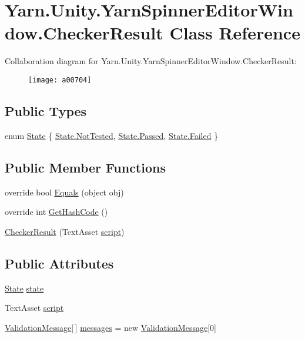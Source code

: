 \hypertarget{a00049}{\section{Yarn.\-Unity.\-Yarn\-Spinner\-Editor\-Window.\-Checker\-Result Class Reference}
\label{a00049}
}


Collaboration diagram for Yarn.\-Unity.\-Yarn\-Spinner\-Editor\-Window.\-Checker\-Result\-:
\nopagebreak
\begin{figure}[H]
\begin{center}
\leavevmode
\texttt{[image: a00704]}
\end{center}
\end{figure}
\subsection*{Public Types}
\begin{DoxyCompactItemize}
\item 
enum \hyperlink{a00049_ab24848d7951ce44eb3c7768c6ee10385}{State} \{ \hyperlink{a00049_ab24848d7951ce44eb3c7768c6ee10385a0197c47523ba5a2bdfef705786687de5}{State.\-Not\-Tested}, 
\hyperlink{a00049_ab24848d7951ce44eb3c7768c6ee10385aa0d0628f6b4e4d78d2ffef4d4d1c4b15}{State.\-Passed}, 
\hyperlink{a00049_ab24848d7951ce44eb3c7768c6ee10385ad7c8c85bf79bbe1b7188497c32c3b0ca}{State.\-Failed}
 \}
\end{DoxyCompactItemize}
\subsection*{Public Member Functions}
\begin{DoxyCompactItemize}
\item 
override bool \hyperlink{a00049_a1e653caad5ab99847c26ff8f67da8f45}{Equals} (object obj)
\item 
override int \hyperlink{a00049_a85d50993390cdd8ba30ac44043b18de7}{Get\-Hash\-Code} ()
\item 
\hyperlink{a00049_af1c9b3d1757d33ad2141c639c3827c97}{Checker\-Result} (Text\-Asset \hyperlink{a00049_a6c852f7521c0a91b519aa3d391f63e6b}{script})
\end{DoxyCompactItemize}
\subsection*{Public Attributes}
\begin{DoxyCompactItemize}
\item 
\hyperlink{a00049_ab24848d7951ce44eb3c7768c6ee10385}{State} \hyperlink{a00049_a7202b24bd068da24d7e28bec5668b13a}{state}
\item 
Text\-Asset \hyperlink{a00049_a6c852f7521c0a91b519aa3d391f63e6b}{script}
\item 
\hyperlink{a00166_a00358}{Validation\-Message}\mbox{[}$\,$\mbox{]} \hyperlink{a00049_a808a039e280cf875cb3c9e9385148498}{messages} = new \hyperlink{a00166_a00358}{Validation\-Message}\mbox{[}0\mbox{]}
\end{DoxyCompactItemize}


